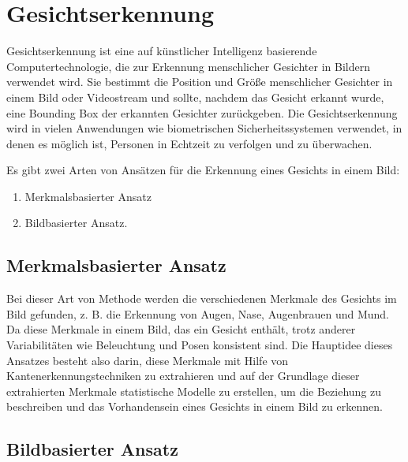 %
%


\chapter{Gesichtserkennung}\label{FaceDetection}

Gesichtserkennung ist eine auf künstlicher Intelligenz basierende Computertechnologie, die zur Erkennung menschlicher Gesichter in Bildern verwendet wird.
Sie bestimmt die Position und Größe menschlicher Gesichter in einem Bild oder Videostream und sollte, nachdem das Gesicht erkannt wurde, eine Bounding Box der erkannten Gesichter zurückgeben. Die Gesichtserkennung wird in vielen Anwendungen wie biometrischen Sicherheitssystemen verwendet, in denen es möglich ist, Personen in Echtzeit zu verfolgen und zu überwachen.

Es gibt zwei Arten von Ansätzen für die Erkennung eines Gesichts in einem Bild:

\begin{enumerate}
	\item Merkmalsbasierter Ansatz 
	\item Bildbasierter Ansatz.
\end{enumerate} 

\bigskip

\section{Merkmalsbasierter Ansatz}

Bei dieser Art von Methode werden die verschiedenen Merkmale des Gesichts im Bild gefunden, z. B. die Erkennung von Augen, Nase, Augenbrauen und Mund. Da diese Merkmale in einem Bild, das ein Gesicht enthält, trotz anderer Variabilitäten wie Beleuchtung und Posen konsistent sind. Die Hauptidee dieses Ansatzes besteht also darin, diese Merkmale mit Hilfe von Kantenerkennungstechniken zu extrahieren und auf der Grundlage dieser extrahierten Merkmale statistische Modelle zu erstellen, um die Beziehung zu beschreiben und das Vorhandensein eines Gesichts in einem Bild zu erkennen.

\section{Bildbasierter Ansatz}

